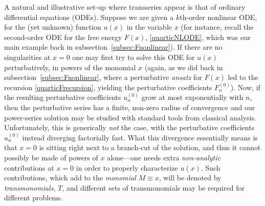 \documentclass[11pt,a4paper]{article}
\begin{document}
A natural and illustrative set-up where transseries appear is that of ordinary differential equations (ODEs). Suppose we are given a $k$th-order nonlinear ODE, for the (yet unknown) function $u(x)$ in the variable $x$ (for instance, recall the second-order ODE for the free energy $F(x)$, \eqref{quarticNLODE}, which was our main example back in subsection~\ref{subsec:Fnonlinear}). If there are no singularities at $x=0$ one may first try to solve this ODE for $u(x)$ perturbatively, in powers of the monomial $x$ (again, as we did back in subsection~\ref{subsec:Fnonlinear}, where a perturbative \textit{ansatz} for $F(x)$ led to the recursion \eqref{quarticFrecursion}, yielding the perturbative coefficients $F_n^{(0)}$). Now, if the resulting perturbative coefficients $u_n^{(0)}$ grow at most exponentially with $n$, then the perturbative series has a finite, non-zero radius of convergence and our power-series solution may be studied with standard tools from classical analysis. Unfortunately, this is generically \textit{not} the case, with the perturbative coefficients $u_n^{(0)}$ instead diverging factorially fast. What this divergence essentially means is that $x=0$ is sitting right next to a branch-cut of the solution, and thus it cannot possibly be made of powers of $x$ alone---one needs extra \textit{non-analytic} contributions at $x=0$ in order to properly characterize $u(x)$. Such contributions, which add to the \textit{monomial} $M \equiv x$, will be denoted by \textit{transmonomials}, $T$, and different sets of transmonomials may be required for different problems.
\end{document}
